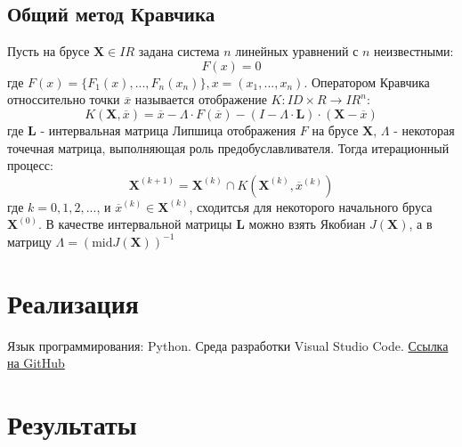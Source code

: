 \documentclass[a4paper,12pt]{article}
\begin{document}
    \subsection{Общий метод Кравчика}
    Пусть на брусе $ \textbf{X} \in IR $ задана система $ n $ линейных уравнений с $ n $ неизвестными:
    \begin{equation}
        F(x) = 0
    \end{equation}
    где $ F(x) = \{F_{1}(x), ..., F_{n}(x_{n})\}, x = (x_{1}, ..., x_{n}) $.
    Оператором Кравчика относсительно точки $ \overline{x} $ называется отображение $ K : ID \times R \to IR^{n} $:
    \begin{equation}
        K(\textbf{X}, \overline{x}) = \overline{x} - \Lambda \cdot F(\overline{x}) - (I - \Lambda \cdot \textbf{L}) \cdot (\textbf{X} - \overline{x})
    \end{equation}
    где $ \textbf{L} $ - интервальная матрица Липшица отображения $ F $ на брусе $ \textbf{X} $, $ \Lambda $ - некоторая точечная матрица, выполняющая роль предобуславливателя.\newline
    Тогда итерационный процесс:
    \begin{equation}
        \textbf{X}^{(k+1)} = \textbf{X}^{(k)} \cap K(\textbf{X}^{(k)}, \overline{x}^{(k)})
    \end{equation}
    где $ k = 0, 1, 2,...$, и $ \overline{x}^{(k)} \in \textbf{X}^{(k)} $, сходитсья для некоторого начального бруса $ \textbf{X}^{(0)} $.\newline
    В качестве интервальной матрицы $ \textbf{L} $ можно взять Якобиан $ J(\textbf{X}) $, а в матрицу $ \Lambda = (\text{mid}J(\textbf{X}))^{-1} $

    \section{Реализация}
    Язык программирования: Python. Среда разработки Visual Studio Code.
    \href{https://github.com/kirillkuks/IntervalAnalysis/tree/master/Lab2}{Ссылка на GitHub}

    \section{Результаты}
\end{document}
